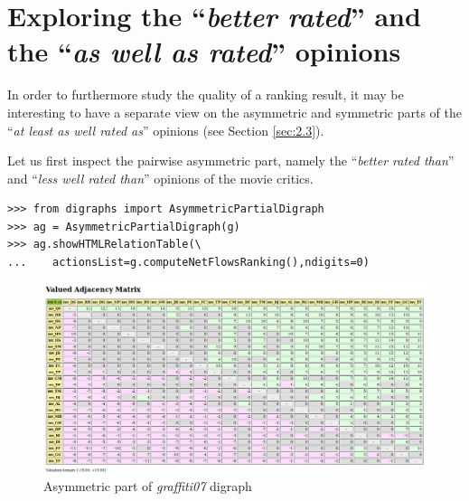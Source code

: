 \section{Exploring the ``\emph{better rated}''  and the ``\emph{as well as rated}'' opinions}
\label{sec:16.5}

In order to furthermore study the quality of a ranking result, it may be interesting to have a separate view on the asymmetric and symmetric parts of the ``\emph{at least as well rated as}'' opinions (see Section \vref{sec:2.3}).

Let us first inspect the pairwise asymmetric part, namely the ``\emph{better rated than}'' and ``\emph{less well rated than}'' opinions of the movie critics. 
\begin{lstlisting}
>>> from digraphs import AsymmetricPartialDigraph
>>> ag = AsymmetricPartialDigraph(g)
>>> ag.showHTMLRelationTable(\
...    actionsList=g.computeNetFlowsRanking(),ndigits=0)
\end{lstlisting}
\begin{figure}[h]
\includegraphics[width=12cm]{Figures/asymmetricPart.png}
\caption{Asymmetric part of \emph{graffiti07} digraph}
\label{fig:16.8}       %
\end{figure}

